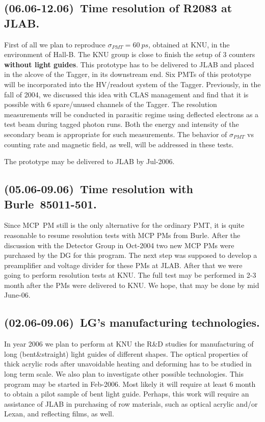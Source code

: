\subsection{(06.06-12.06)~Time resolution  of R2083 at JLAB.}
First of all we plan to reproduce   $\sigma_{PMT}=60~ps$, obtained at KNU,
in the environment of Hall-B.
The KNU group  is  close to finish  the setup of 3 counters 
\textbf{without light guides}. 
This  prototype has to be delivered to JLAB and placed in the alcove of the Tagger, in its downstream end. 
Six PMTs of this prototype will be incorporated
into the HV/readout system of the Tagger.
Previously, in the fall of 2004,  
we discussed this idea with CLAS management and  find that it is possible with 6 spare/unused channels of the Tagger.
The resolution measurements  will be conducted in parasitic regime
using  deflected electrons as a test beam during tagged photon runs.
Both the energy and intensity of the secondary beam is appropriate for such measurements. 
The  behavior of  $\sigma_{PMT}$ vs counting rate and magnetic field, as well, 
 will be addressed in these tests.


The prototype may be delivered to JLAB by  Jul-2006.



\subsection{(05.06-09.06)~Time resolution with  Burle~85011-501.}
\label{meas85011}
Since MCP~PM still is the only alternative for the ordinary PMT, 
it is quite reasonable to resume resolution tests with MCP PMs from Burle.
After the discussion  with the Detector Group in Oct-2004
two new MCP PMs were purchased by the DG for this program.
The next step was supposed to develop a preamplifier and voltage divider for these PMs at JLAB.
After that we were going to  perform resolution tests at KNU.
The full test may be performed  in 2-3 month after the  PMs were delivered to KNU.
We hope,  that may  be done by mid June-06.


\subsection{(02.06-09.06)~LG's manufacturing technologies.} 

In year 2006 we plan to perform at KNU the R\&D studies 
for manufacturing of long (bent\&straight) light guides of different
shapes.  
The optical properties of thick acrylic rods
after unavoidable  heating and deforming  
has to be studied in long term scale. 
 We also  plan to investigate other possible technologies.
This program may be started  in Feb-2006. 
Most likely it will require at least 6 month to obtain
a pilot  sample of bent light guide. 
Perhaps, this work will require an  assistance of JLAB in purchasing  of row materials, 
such as optical acrylic and/or Lexan, and reflecting films, as well.
